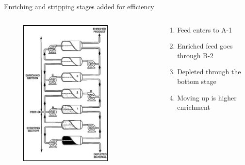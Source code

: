 \documentclass[aspectratio=1610,pdftex,dvipsnames,compress,xcolor={dvipsnames}]{beamer}
\begin{document}
\begin{frame}{Enriching and stripping stages added for efficiency}
    \begin{columns}

        \begin{column}{0.40\textwidth}
            \begin{figure}
                \centering
                \includegraphics[width=0.75\textwidth]{Gas_Diffusion.jpg}
            \end{figure}
        \end{column}

        \begin{column}{0.60\textwidth}
            \begin{enumerate}[series=outerlist,topsep=0pt,itemsep=21pt,leftmargin=*,label=(\arabic*)]
                \item[]Feed enters to A-1
                \item[]Enriched feed goes through B-2
                \item[]Depleted through the bottom stage
                \item[]Moving up is higher enrichment
            \end{enumerate}
        \end{column}

    \end{columns}
\end{frame}
\end{document}

